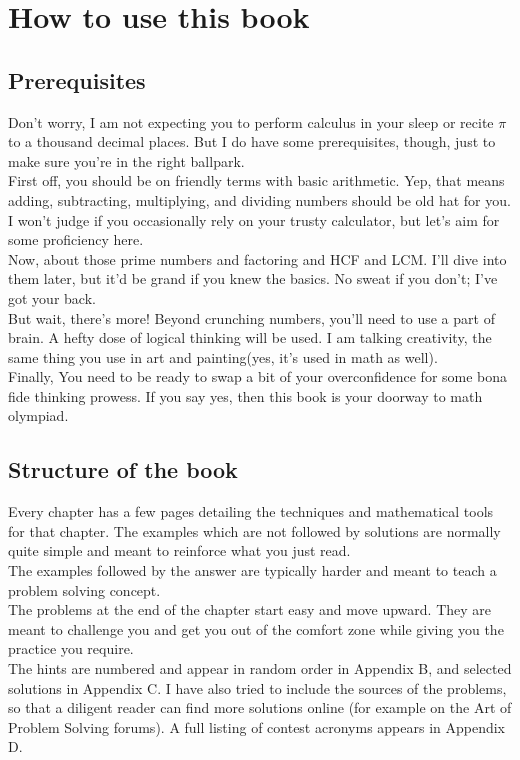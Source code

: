 \chapter{How to use this book}
\section{Prerequisites}
Don't worry, I am not expecting you to perform calculus in your sleep or recite $\pi$ to a thousand decimal places. But I do have some prerequisites, though, just to make sure you're in the right ballpark.\\
First off, you should be on friendly terms with basic arithmetic. Yep, that means adding, subtracting, multiplying, and dividing numbers should be old hat for you. I won't judge if you occasionally rely on your trusty calculator, but let's aim for some proficiency here.\\
Now, about those prime numbers and factoring and HCF and LCM. I'll dive into them later, but it'd be grand if you knew the basics. No sweat if you don't; I've got your back.\\
But wait, there's more! Beyond crunching numbers, you'll need to use a part of brain. A hefty dose of logical thinking will be used. I am talking creativity, the same thing you use in art and painting(yes, it's used in math as well).\\
Finally, You need to be ready to swap a bit of your overconfidence for some bona fide thinking prowess. If you say yes, then this book is your doorway to math olympiad.\\
\section{Structure of the book}
Every chapter has a few pages detailing the techniques and mathematical tools for that chapter. The examples which are not followed by solutions are normally quite simple and meant to reinforce what you just read.\\
The examples followed by the answer are typically harder and meant to teach a problem solving concept.\\
The problems at the end of the chapter start easy and move upward. They are meant to challenge you and get you out of the comfort zone while giving you the practice you require. \\
The hints are numbered and appear in random order in Appendix B, and selected solutions in Appendix C. I have also tried to include the sources of the problems, so that a diligent reader can find more solutions online (for example on the Art of Problem Solving forums). A full listing of contest acronyms appears in Appendix D.\\
